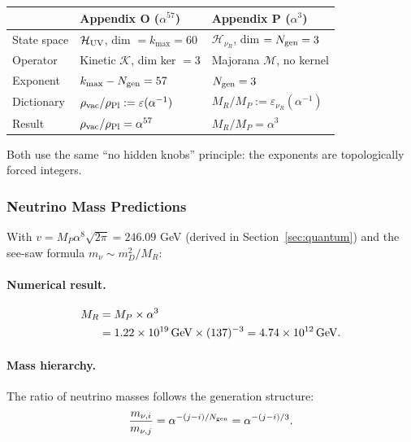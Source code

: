 \begin{center}
\small
\begin{tabular}{lll}
\toprule
& \textbf{Appendix O ($\alpha^{57}$)} & \textbf{Appendix P ($\alpha^3$)} \\
\midrule
State space & $\mathcal{H}_{\rm UV}$, dim $= k_{\max} = 60$ & $\mathcal{H}_{\nu_R}$, dim $= N_{\rm gen} = 3$ \\
Operator & Kinetic $\mathcal{K}$, dim ker $= 3$ & Majorana $\mathcal{M}$, no kernel \\
Exponent & $k_{\max} - N_{\rm gen} = 57$ & $N_{\rm gen} = 3$ \\
Dictionary & $\rho_{\rm vac}/\rho_{\rm Pl} := \varepsilon(\alpha^{-1})$ & $M_R/M_P := \varepsilon_{\nu_R}(\alpha^{-1})$ \\
Result & $\rho_{\rm vac}/\rho_{\rm Pl} = \alpha^{57}$ & $M_R/M_P = \alpha^3$ \\
\bottomrule
\end{tabular}
\end{center}

Both use the same ``no hidden knobs'' principle: the exponents are topologically forced integers.

\subsubsection{Neutrino Mass Predictions}\label{sec:P_neutrino}

With $v = M_P\alpha^8\sqrt{2\pi} = 246.09$ GeV (derived in Section~\ref{sec:quantum}) and the see-saw formula
$m_\nu \sim m_D^2/M_R$:

\paragraph{Numerical result.}
\begin{align}
M_R &= M_P \times \alpha^3 \notag\\
&= 1.22 \times 10^{19}\,\text{GeV} \times (137)^{-3} = 4.74 \times 10^{12}\,\text{GeV}.
\end{align}

\paragraph{Mass hierarchy.}
The ratio of neutrino masses follows the generation structure:
\begin{equation}
\frac{m_{\nu,i}}{m_{\nu,j}} = \alpha^{-(j-i)/N_{\rm gen}} = \alpha^{-(j-i)/3}.
\end{equation}

